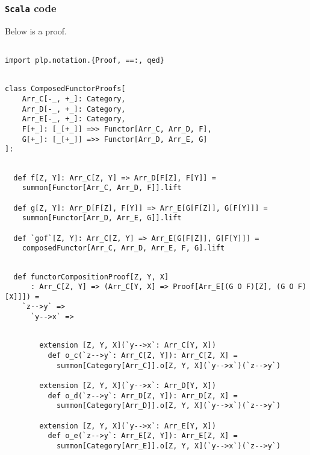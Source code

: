 \documentclass[11pt]{article}
\newcommand{\code}{\subsubsection{{\tt Scala} code}\begingroup\rm \vspace{12pt}}
\begin{document}
\code
Below is a proof.

\vspace{6pt}
\begin{mdframed}[backgroundcolor=lightgray!20] 
\begin{lstlisting}
 
import plp.notation.{Proof, ==:, qed}
\end{lstlisting}
\end{mdframed}
\vspace{6pt}
\begin{mdframed}[backgroundcolor=lightgray!20] 
\begin{lstlisting}

class ComposedFunctorProofs[
    Arr_C[-_, +_]: Category,
    Arr_D[-_, +_]: Category,
    Arr_E[-_, +_]: Category,
    F[+_]: [_[+_]] =>> Functor[Arr_C, Arr_D, F],
    G[+_]: [_[+_]] =>> Functor[Arr_D, Arr_E, G]
]:
\end{lstlisting}
\end{mdframed}
\vspace{6pt}
\begin{mdframed}[backgroundcolor=lightgray!20] 
\begin{lstlisting}

  def f[Z, Y]: Arr_C[Z, Y] => Arr_D[F[Z], F[Y]] =
    summon[Functor[Arr_C, Arr_D, F]].lift

  def g[Z, Y]: Arr_D[F[Z], F[Y]] => Arr_E[G[F[Z]], G[F[Y]]] =
    summon[Functor[Arr_D, Arr_E, G]].lift

  def `gof`[Z, Y]: Arr_C[Z, Y] => Arr_E[G[F[Z]], G[F[Y]]] =
    composedFunctor[Arr_C, Arr_D, Arr_E, F, G].lift    
\end{lstlisting}
\end{mdframed}
\vspace{6pt}
\begin{mdframed}[backgroundcolor=lightgray!20] 
\begin{lstlisting} 
   
  def functorCompositionProof[Z, Y, X]
      : Arr_C[Z, Y] => (Arr_C[Y, X] => Proof[Arr_E[(G O F)[Z], (G O F)[X]]]) =
    `z-->y` =>
      `y-->x` =>        
\end{lstlisting}
\end{mdframed}
\vspace{6pt}
\begin{mdframed}[backgroundcolor=lightgray!20] 
\begin{lstlisting}

        extension [Z, Y, X](`y-->x`: Arr_C[Y, X])
          def o_c(`z-->y`: Arr_C[Z, Y]): Arr_C[Z, X] =
            summon[Category[Arr_C]].o[Z, Y, X](`y-->x`)(`z-->y`)

        extension [Z, Y, X](`y-->x`: Arr_D[Y, X])
          def o_d(`z-->y`: Arr_D[Z, Y]): Arr_D[Z, X] =
            summon[Category[Arr_D]].o[Z, Y, X](`y-->x`)(`z-->y`)

        extension [Z, Y, X](`y-->x`: Arr_E[Y, X])
          def o_e(`z-->y`: Arr_E[Z, Y]): Arr_E[Z, X] =
            summon[Category[Arr_E]].o[Z, Y, X](`y-->x`)(`z-->y`)
\end{lstlisting}
\end{mdframed}
\end{document}
